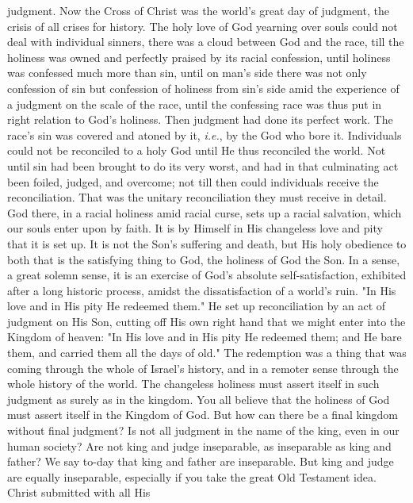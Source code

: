 \documentclass[12pt,a5paper,twoside,titlepage]{book}
\begin{document}
judgment. Now the Cross of Christ was the 
world's great day of judgment, the crisis of all 
crises for history. The holy love of God yearning 
over souls could not deal with individual 
sinners, there was a cloud between God and the 
race, till the holiness was owned and perfectly 
praised by its racial confession, until holiness 
was confessed much more than sin, until on 
man's side there was not only confession of 
sin but confession of holiness from sin's side 
amid the experience of a judgment on the 
scale of the race, until the confessing race 
was thus put in right relation to God's holiness. 
Then judgment had done its perfect 
work. The race's sin was covered and atoned 
by it, \textit{i.e.}, by the God who bore it. Individuals 
could not be reconciled to a holy God until 
He thus reconciled the world. Not until sin had 
been brought to do its very worst, and had in 
that culminating act been foiled, judged, and 
overcome; not till then could individuals receive 
the reconciliation. That was the unitary reconciliation 
they must receive in detail. God there, 
in a racial holiness amid racial curse, sets 
up a racial salvation, which our souls enter 
upon by faith. It is by Himself in His changeless 
love and pity that it is set up. It is not the 
Son's suffering and death, but His holy obedience 
to both that is the satisfying thing to God, the 
holiness of God the Son. In a sense, a great 
solemn sense, it is an exercise of God's absolute 
self-satisfaction, exhibited after a long historic 
process, amidst the dissatisfaction of a world's 
ruin. "In His love and in His pity He redeemed 
them." He set up reconciliation by an act of 
judgment on His Son, cutting off His own right 
hand that we might enter into the Kingdom 
of heaven: "In His love and in His pity He 
redeemed them; and He bare them, and carried 
them all the days of old." The redemption was 
a thing that was coming through the whole of 
Israel's history, and in a remoter sense through 
the whole history of the world. The changeless 
holiness must assert itself in such judgment as 
surely as in the kingdom. You all believe that 
the holiness of God must assert itself in the 
Kingdom of God. But how can there be a final 
kingdom without final judgment? Is not all 
judgment in the name of the king, even in our 
human society? Are not king and judge inseparable, 
as inseparable as king and father? 
We say to-day that king and father are inseparable. 
But king and judge are equally 
inseparable, especially if you take the great Old 
Testament idea. Christ submitted with all His 
\end{document}
